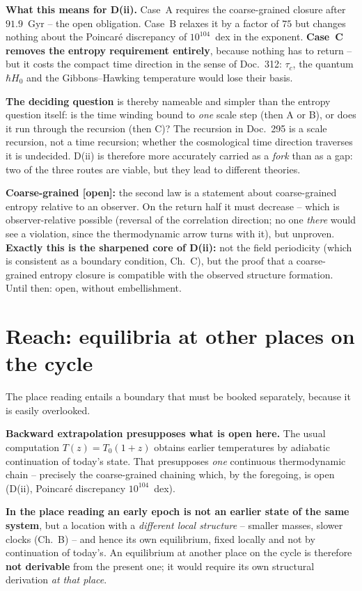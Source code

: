 \documentclass[11pt]{report}
\begin{document}
\textbf{What this means for D(ii).} Case~A requires the
coarse-grained closure after $91.9$~Gyr -- the open obligation.
Case~B relaxes it by a factor of $75$ but changes nothing about
the Poincaré discrepancy of $10^{104}$~dex in the exponent.
\textbf{Case~C removes the entropy requirement entirely}, because
nothing has to return -- but it costs the compact time direction
in the sense of Doc.~312: $\tau_c$, the quantum $\hbar H_0$ and
the Gibbons--Hawking temperature would lose their basis.

\textbf{The deciding question} is thereby nameable and simpler
than the entropy question itself: is the time winding bound to
\emph{one} scale step (then A or B), or does it run through the
recursion (then C)? The recursion in Doc.~295 is a scale
recursion, not a time recursion; whether the cosmological time
direction traverses it is undecided. D(ii) is therefore more
accurately carried as a \emph{fork} than as a gap: two of the
three routes are viable, but they lead to different theories.

\textbf{Coarse-grained [open]:} the second law is a statement
about coarse-grained entropy relative to an observer. On the
return half it must decrease -- which is observer-relative
possible (reversal of the correlation direction; no one
\emph{there} would see a violation, since the thermodynamic arrow
turns with it), but unproven. \textbf{Exactly this is the
sharpened core of D(ii):} not the field periodicity (which is
consistent as a boundary condition, Ch.~C), but the proof that a
coarse-grained entropy closure is compatible with the observed
structure formation. Until then: open, without embellishment.

\section{Reach: equilibria at other places on the cycle}

The place reading entails a boundary that must be booked
separately, because it is easily overlooked.

\textbf{Backward extrapolation presupposes what is open here.}
The usual computation $T(z) = T_0(1+z)$ obtains earlier
temperatures by adiabatic continuation of today's state. That
presupposes \emph{one} continuous thermodynamic chain -- precisely
the coarse-grained chaining which, by the foregoing, is open
(D(ii), Poincaré discrepancy $10^{104}$~dex).

\textbf{In the place reading an early epoch is not an earlier
state of the same system}, but a location with a \emph{different
local structure} -- smaller masses, slower clocks (Ch.~B) -- and
hence its own equilibrium, fixed locally and not by continuation
of today's. An equilibrium at another place on the cycle is
therefore \textbf{not derivable} from the present one; it would
require its own structural derivation \emph{at that place}.
\end{document}
